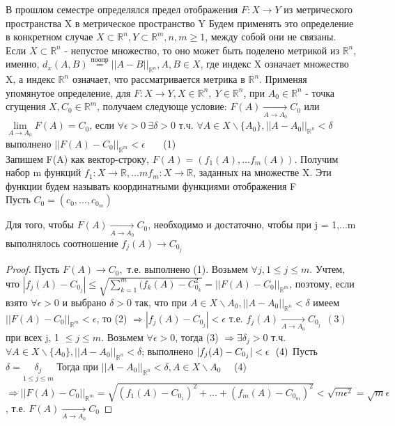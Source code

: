 В прошлом семестре определялся предел отображения $F : X \to Y$ из метрического пространства X в метрическое пространство Y Будем применять это определение в конкретном случае $X \subset \mathbb{R}^n, Y \subset \mathbb{R}^m, n,m \geq 1$, между собой они не связаны. Если $X \subset \mathbb{R}^n$ - непустое множество, то оно может быть поделено метрикой из $\mathbb{R}^n$, именно, $d_x(A,B) \overset{по опр}{=} ||A-B||_{\mathbb{R}^n},A,B \in X$, где индекс X означает множество X, а индекс $\mathbb{R}^n$ означает, что рассматривается метрика в $\mathbb{R}^n$. Применяя упомянутое определение, для $F: X \to Y, X \in \mathbb{R}^n, \ Y \in \mathbb{R}^n$, при $A_0 \in \mathbb{R}^n$ - точка сгущения $X, C_0 \in \mathbb{R}^m$, получаем следующе условие: $F(A) \underset{A \to A_0}{\to} C_0$ или $\lim\limits_{A \to A_0}{F(A)}= C_0$, если $\forall \epsilon > 0 \ \exists \delta > 0$ т.ч. $\forall A \in X \backslash\{A_0\}, ||A -A_0||_{\mathbb{R}^n} <\delta$ выполнено $||F(A)-C_0||_{\mathbb{R}^m} < \epsilon$ \ \ \ (1) \\
Запишем F(A) как вектор-строку, $F(A) = (f_1(A),...f_m(A)). $ Получим набор m функций $f_1:X \to \mathbb{R},...m f_m: X \to \mathbb{R}$, заданных на множестве X. Эти функции будем называть координатными функциями отображения F \\
Пусть $C_0 = (c_0,...,c_{0_m})$
\begin{theorem}
	Для того, чтобы $F(A) \underset{A \to A_0}{\to} C_0$, необходимо и достаточно, чтобы при j = 1,...m выполнялось соотношение $f_j(A) \to C_{0_j}$ 
\end{theorem}
\begin{proof}
Пусть $ F(A) \to C_0,$ т.е. выполнено (1). Возьмем $\forall j, 1\leq j \leq m.$ Учтем, что $|f_j(A) - C_{0_j}| \leq \sqrt{\sum_{k = 1}^{m}{(f_k(A)-C_{0_k}^2}} = ||F(A) -C_0||_{\mathbb{R}^m}$, поэтому, если взято $\forall \epsilon > 0$ и выбрано $\delta > 0$ так, что при $A \in X \backslash {A_0}, ||A-A_0||_{\mathbb{R}^n} < \delta$ имеем $||F(A)-C_0||_{\mathbb{R}^m}<\epsilon$, то (2) $\Rightarrow |f_j(A)-C_{0_j}|<\epsilon$ т.е. $f_j(A) \underset{A \to A_0}{\to} C_{0_j} \ \ (3)$ при всех j, 1 $ \leq j\leq m$. Возьмем $\forall \epsilon > 0$, тогда (3) $\Rightarrow \exists \delta_j > 0$ т.ч. $\forall A \in X \backslash \{A_0\},||A-A_0||_{\mathbb{R}^n}<\delta$; выполнено $|f_j(A)-C_{0_j}| < \epsilon \ \  (4) \\ $
Пусть $\delta = \underset{1 \leq j \leq m}{\delta_j}$ Тогда при $||A-A_0||_{\mathbb{R}^n} < \delta , A \in X \backslash A_0$ \ \ (4) $\Rightarrow ||F(A) -C_0||_{\mathbb{R}^m}=\sqrt{(f_1(A)-C_{0_1})^2+...+(f_m(A)-C_{0_m})^2} < \sqrt{m\epsilon^2} = \sqrt{m}\epsilon$, т.е. $F(A) \underset{A \to A_0}{\to } C_0$
\end{proof}
